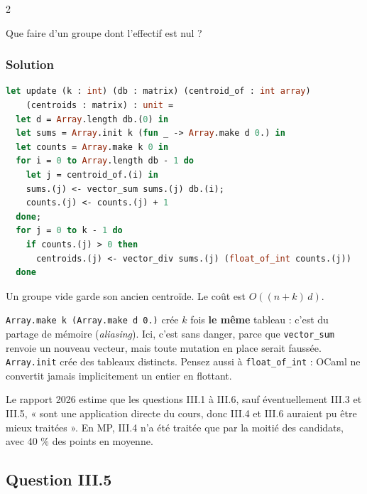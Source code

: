 \documentclass[11pt,a4paper]{article}
\begin{document}
\begin{indication}{2}

Que faire d'un groupe dont l'effectif est nul ?

\end{indication}

\hypertarget{solution-20}{%
\subsubsection{Solution}\label{solution-20}}

\begin{lstlisting}[language=Caml]
let update (k : int) (db : matrix) (centroid_of : int array)
    (centroids : matrix) : unit =
  let d = Array.length db.(0) in
  let sums = Array.init k (fun _ -> Array.make d 0.) in
  let counts = Array.make k 0 in
  for i = 0 to Array.length db - 1 do
    let j = centroid_of.(i) in
    sums.(j) <- vector_sum sums.(j) db.(i);
    counts.(j) <- counts.(j) + 1
  done;
  for j = 0 to k - 1 do
    if counts.(j) > 0 then
      centroids.(j) <- vector_div sums.(j) (float_of_int counts.(j))
  done
\end{lstlisting}

Un groupe vide garde son ancien centroïde. Le coût est \(O((n+k)\,d)\).

\begin{piege}

\texttt{Array.make\ k\ (\allowbreak{}Array.make\ d\ 0.)\allowbreak{}} crée \(k\) fois \textbf{le même} tableau : c'est du partage de mémoire (\emph{aliasing}). Ici, c'est sans danger, parce que \texttt{vector\_sum} renvoie un nouveau vecteur, mais toute mutation en place serait faussée. \texttt{Array.init} crée des tableaux distincts. Pensez aussi à \texttt{float\_of\_int} : OCaml ne convertit jamais implicitement un entier en flottant.

\end{piege}

\begin{jury}

Le rapport 2026 estime que les questions III.1 à III.6, sauf éventuellement III.3 et III.5, « sont une application directe du cours, donc III.4 et III.6 auraient pu être mieux traitées ». En MP, III.4 n'a été traitée que par la moitié des candidats, avec 40 \% des points en moyenne.

\end{jury}

\hypertarget{question-iii.5}{%
\subsection{Question III.5}\label{question-iii.5}}
\end{document}
